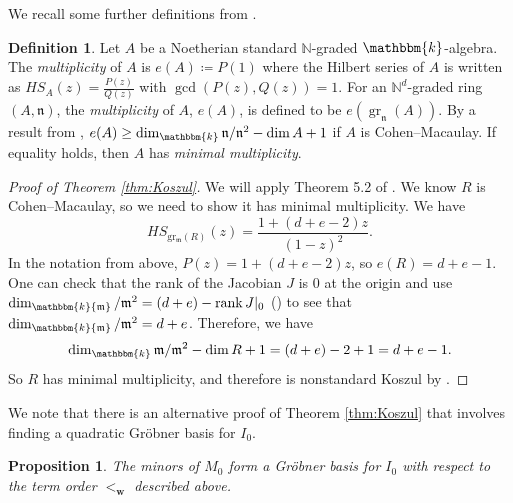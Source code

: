 \documentclass[12pt,reqno]{amsart}
\newtheorem{proposition}[theorem]{Proposition}
\theoremstyle{definition}
\newtheorem{definition}[theorem]{Definition}
\theoremstyle{remark}
\newcommand{\rank}{\operatorname{rank}}
\newcommand{\gr}{\operatorname{gr}}
\newcommand{\grm}{\operatorname{gr_\frakm}}
\newcommand{\grmR}{{\grm(R)}}
\newcommand{\bbk}{\mathbbm{k}}
\newcommand{\frakm}{{\mathfrak{m}}}
\newcommand{\bfw}{{\mathbf{w}}}
\begin{document}
We recall some further definitions from \cite[p. 56]{hrwTKoszulPropIAffSemigroupRings}.

\begin{definition}
Let $A$ be a Noetherian standard $\mathbb N$-graded $\bbk$-algebra.  The \textit{multiplicity} of $A$ is $e(A) \coloneqq P(1)$ where the Hilbert series of $A$ is written as $HS_{A}(z) = \frac{P(z)}{Q(z)}$ with $\gcd(P(z),Q(z)) = 1$.  For an $\mathbb N^d$-graded ring $(A,\mathfrak{n})$, the \textit{multiplicity} of $A$, $e(A)$, is defined to be $e(\gr_\mathfrak{n}(A))$. By a result from \cite{aLocalRingsHighEmbDim}, $e(A) \geq \dim_\bbk \mathfrak{n}/\mathfrak{n}^2-\dim A + 1$ if $A$ is Cohen--Macaulay.  If equality holds, then $A$ has \textit{minimal multiplicity}.
\end{definition}



\begin{proof}[Proof of Theorem \ref{thm:Koszul}]
We will apply Theorem 5.2 of \cite{hrwTKoszulPropIAffSemigroupRings}. We know $R$ is Cohen--Macaulay, so we need to show it has minimal multiplicity.  We have
$$
HS_\grmR (z) = \frac{1+(d+e-2)z}{(1-z)^2}.
$$
In the notation from above, $P(z) = 1+(d+e-2)z$, so $e(R) = d+e-1$. One can check that the rank of the Jacobian $J$ is $0$ at the origin and use $\dim_\bbk \frakm/\frakm^2 = (d+e) - \rank J|_0$ (\cite[Theorem 5.1]{hartshorne1977graduate}) to see that $\dim_\bbk \frakm/\frakm^2= d+e$. Therefore, we have
$$
\dim_{\bbk} \frakm/\frakm^2-\dim R + 1 = (d+e)-2+1 = d+e-1.
$$
So $R$ has minimal multiplicity, and therefore is nonstandard Koszul by \cite[Theorem~5.2]{hrwTKoszulPropIAffSemigroupRings}.
\end{proof}

We note that there is an alternative proof of Theorem \ref{thm:Koszul} that involves finding a quadratic Gr\"obner basis for $I_0$.

\begin{proposition}
    The minors of $M_0$ form a Gr\"obner basis for $I_0$ with respect to the term order $<_\bfw$ described above. 
\end{proposition}
\end{document}
